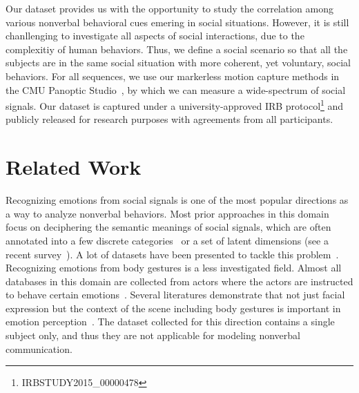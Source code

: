 Our dataset provides us with the opportunity to study the correlation among various nonverbal behavioral cues emering in social situations. However, it is still chanllenging to investigate all aspects of social interactions, due to the complexitiy of human behaviors.  Thus, we define a social scenario so that all the subjects are in the same social situation with more coherent, yet voluntary, social behaviors. For all sequences, we use our markerless motion capture methods in the CMU Panoptic Studio~\cite{joo2017panoptic, joo2018}, by which we can measure a wide-spectrum of social signals.  Our dataset is captured under a university-approved IRB protocol\footnote{IRBSTUDY2015\_00000478} and publicly released for research purposes with agreements from all participants. 


\section{Related Work}
Recognizing emotions from social signals is one of the most popular directions as a way to analyze nonverbal behaviors. Most prior approaches in this domain focus on deciphering the semantic meanings of social signals, which are often annotated into a few discrete categories~\cite{ekman1969} or a set of latent dimensions\cite{osgood1952nature, russell1979affective, plutchik2001nature} (see a recent survey~\cite{noroozi2018survey}). A lot of datasets have been presented to tackle this problem~\cite{lucey2010extended,gross2010multi,dhall2013emotion, mollahosseini2016facial, fabian2016emotionet, mollahosseini2017affectnet}. Recognizing emotions from body gestures is a less investigated field. Almost all databases in this domain are collected from actors where the actors are instructed to behave certain emotions~\cite{gunes2006bimodal, banziger2012introducing, de2004modeling}. Several literatures demonstrate that not just facial expression but the context of the scene including body gestures is important in emotion perception~\cite{barrett2011context, aviezer2008angry}. The dataset collected for this direction contains a single subject only, and thus they are not applicable for modeling nonverbal communication.

